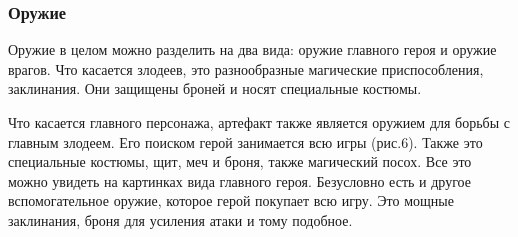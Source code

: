 \documentclass{article}
\begin{document}
\subsubsection{Оружие}
\par Оружие в целом можно разделить на два вида: оружие главного героя и оружие врагов. Что касается злодеев, это разнообразные магические приспособления, заклинания. Они защищены броней и носят специальные костюмы. 
\par Что касается главного персонажа, артефакт также является оружием для борьбы с главным злодеем. Его поиском герой занимается всю игры (рис.6). Также это специальные костюмы, щит, меч и броня, также магический посох. Все это можно увидеть на картинках вида главного героя. 
Безусловно есть и другое вспомогательное оружие, которое герой покупает всю игру. Это мощные заклинания, броня для усиления атаки и тому подобное.
\end{document}
